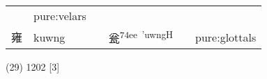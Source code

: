 \documentclass[14pt,a4paper]{scrartcl}
\begin{document}
\begin{longtable}[c]{@{}llllll@{}}
\begin{minipage}[t]{0.14\columnwidth}
\strut\end{minipage} &
\begin{minipage}[t]{0.14\columnwidth}\raggedright\strut
pure:velars
\strut\end{minipage}\tabularnewline
\begin{minipage}[t]{0.14\columnwidth}\raggedright\strut
雍
\strut\end{minipage} &
\begin{minipage}[t]{0.14\columnwidth}\raggedright\strut
kuwng
\strut\end{minipage} &
\begin{minipage}[t]{0.14\columnwidth}\raggedright\strut
\strut\end{minipage} &
\begin{minipage}[t]{0.14\columnwidth}\raggedright\strut
瓮\textsuperscript{74ee~'uwngH}
\strut\end{minipage} &
\begin{minipage}[t]{0.14\columnwidth}\raggedright\strut
\strut\end{minipage} &
\begin{minipage}[t]{0.14\columnwidth}\raggedright\strut
pure:glottals
\strut\end{minipage}\tabularnewline
\bottomrule
\end{longtable}

(29) 1202 {[}3{]}
\end{document}
